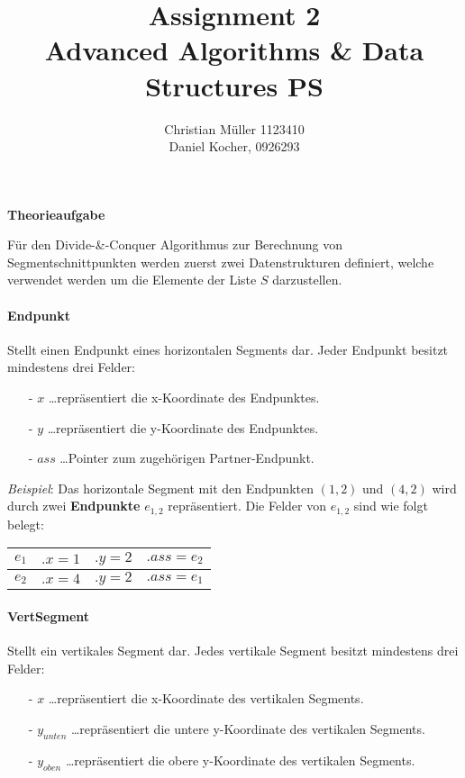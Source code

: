\documentclass{article}
\begin{document}
%
\title{Assignment 2 \\ Advanced Algorithms \& Data Structures PS}%
\author{Christian Müller 1123410 \\ Daniel Kocher, 0926293}%
\maketitle%
\clearpage%
%
{\noindent\bfseries Theorieaufgabe}%

\medskip%

{\noindent\LARGE }%

\medskip%
\noindent
F{\"u}r den Divide-\&-Conquer Algorithmus zur Berechnung von Segmentschnittpunkten
werden zuerst zwei Datenstrukturen definiert, welche verwendet werden um die
Elemente der Liste $S$ darzustellen.

\paragraph{Endpunkt}
Stellt einen Endpunkt eines horizontalen Segments dar.
Jeder Endpunkt besitzt mindestens drei Felder:
\begin{itemize}
  \item[-] $x$ \ldots repr{\"a}sentiert die x-Koordinate des Endpunktes.
  \item[-] $y$ \ldots repr{\"a}sentiert die y-Koordinate des Endpunktes.
  \item[-] $ass$ \ldots Pointer zum zugeh{\"o}rigen Partner-Endpunkt.
\end{itemize}

\emph{Beispiel}: Das horizontale Segment mit den Endpunkten $(1, 2)$ und $(4, 2)$ wird
durch zwei {\bfseries Endpunkte} $e_{1, 2}$ repr{\"a}sentiert. Die Felder von
$e_{1, 2}$ sind wie folgt belegt:

\begin{center}
\begin{tabular}{l||l|l|l|}
  \hline
  $e_1$ & $.x = 1$ & $.y = 2$ & $.ass = e_2$ \tabularnewline
  \hline
  $e_2$ & $.x = 4$ & $.y = 2$ & $.ass = e_1$ \tabularnewline
  \hline
\end{tabular}
\end{center}

\paragraph{VertSegment}
Stellt ein vertikales Segment dar. Jedes vertikale Segment besitzt mindestens
drei Felder:
\begin{itemize}
  \item[-] $x$ \ldots repr{\"a}sentiert die x-Koordinate des vertikalen Segments.
  \item[-] $y_{unten}$ \ldots repr{\"a}sentiert die untere y-Koordinate des
    vertikalen Segments.
  \item[-] $y_{oben}$ \ldots repr{\"a}sentiert die obere y-Koordinate des
    vertikalen Segments.
\end{itemize}
\end{document}
